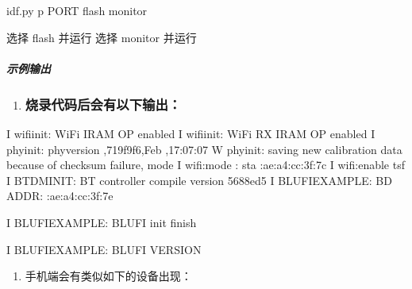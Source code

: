 \documentclass[a4paper,12pt,english]{sphinxmanual}
\begin{document}
{{\sphinxAtStartPar
{}

\begin{sphinxVerbatim}[commandchars=\\\{\}]
idf.py \PYGZhy{}p PORT flash monitor
\PYG{c+c1}{\PYGZsh{}（要退出串行监视器，请键入Ctrl\PYGZhy{}]。）}
\end{sphinxVerbatim}

\sphinxAtStartPar
{}

\begin{sphinxVerbatim}[commandchars=\\\{\}]
选择 flash 并运行
选择 monitor 并运行
\end{sphinxVerbatim}


\subparagraph{示例输出}
\label{\detokenize{exp-esp32/bluetooth/blufi:id9}}\begin{enumerate}
%
\item {} \subsubsection*{烧录代码后会有以下输出：}

\end{enumerate}

\begin{sphinxVerbatim}[commandchars=\\\{\}]
I  wifi\PYGZus{}init: WiFi IRAM OP enabled
I  wifi\PYGZus{}init: WiFi RX IRAM OP enabled
I  phy\PYGZus{}init: phy\PYGZus{}version ,719f9f6,Feb  ,17:07:07
W  phy\PYGZus{}init: saving new calibration data because of checksum failure, mode
I  wifi:mode : sta :ae:a4:cc:3f:7c
I  wifi:enable tsf
I  BTDM\PYGZus{}INIT: BT controller compile version \PYG{o}{[}5688ed5\PYG{o}{]}
I  BLUFI\PYGZus{}EXAMPLE: BD ADDR: :ae:a4:cc:3f:7e

I  BLUFI\PYGZus{}EXAMPLE: BLUFI init finish

I  BLUFI\PYGZus{}EXAMPLE: BLUFI VERSION 
\end{sphinxVerbatim}
\begin{enumerate}
%
\setcounter{enumi}{1}
\item {} 
\sphinxAtStartPar
手机端会有类似如下的设备出现：


\end{enumerate}}}
\end{document}
